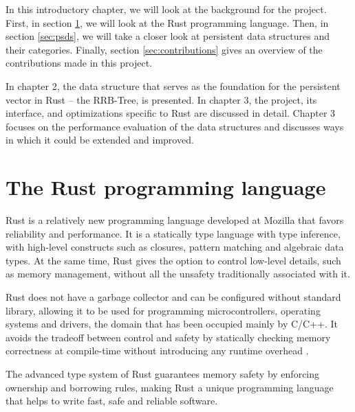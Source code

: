 In this introductory chapter, we will look at the background for the \pvecrs{} project. First, in section \ref{sec:rust}, we will look at the Rust programming language. Then, in section \ref{sec:psds}, we will take a closer look at persistent data structures and their categories. Finally, section \ref{sec:contributions} gives an overview of the contributions made in this project.

In chapter 2, the data structure that serves as the foundation for the persistent vector in Rust -- the RRB-Tree, is presented. In chapter 3, the \pvecrs{} project, its interface, and optimizations specific to Rust are discussed in detail. Chapter 3 focuses on the performance evaluation of the data structures and discusses ways in which it could be extended and improved.


\section{The Rust programming language}
\label{sec:rust}

Rust is a relatively new programming language developed at Mozilla that favors reliability and performance. It is a statically type language with type inference, with high-level constructs such as closures, pattern matching and algebraic data types. At the same time, Rust gives the option to control low-level details, such as memory management, without all the unsafety traditionally associated with it.

Rust does not have a garbage collector and can be configured without standard library, allowing it to be used for programming microcontrollers, operating systems and drivers, the domain that has been occupied mainly by C/C++. It avoids the tradeoff between control and safety by statically checking memory correctness at compile-time without introducing any runtime overhead \cite{reed-patina}.

The advanced type system of Rust guarantees memory safety by enforcing ownership and borrowing rules, making Rust a unique programming language that helps to write fast, safe and reliable software.

